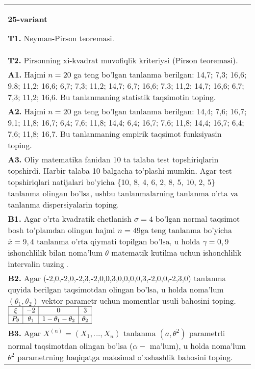 \documentclass{article}
\begin{document}
\vspace{1cm}


\begin{tabular}{m{17cm}}
\textbf{25-variant}
\newline

\textbf{T1.} 
Neyman-Pirson teoremasi.
\\
\textbf{T2.} 
Pirsonning xi-kvadrat muvofiqlik kriteriysi (Pirson teoremasi).
\\
\textbf{A1.} 
Hajmi \(n = 20\) ga teng bo'lgan tanlanma berilgan: 14,7; 7,3; 16,6; 9,8; 11,2; 16,6; 6,7; 7,3; 11,2; 14,7; 6,7; 16,6; 7,3; 11,2; 14,7; 16,6; 6,7; 7,3; 11,2; 16,6. Bu tanlanmaning statistik taqsimotin toping.
\\
\textbf{A2.} 
Hajmi \(n = 20\) ga teng bo'lgan tanlanma berilgan: 14,4; 7,6; 16,7; 9,1; 11,8; 16,7; 6,4; 7,6; 11,8; 14,4; 6,4; 16,7; 7,6; 11,8; 14,4; 16,7; 6,4; 7,6; 11,8; 16,7. Bu tanlanmaning empirik taqsimot funksiyasin toping.
\\
\textbf{A3.} 
Oliy matematika fanidan 10 ta talaba test topshiriqlarin topshirdi. Harbir talaba 10 balgacha to'plashi mumkin. Agar test topshiriqlari natijalari bo'yicha \{10, 8, 4, 6, 2, 8, 5, 10, 2, 5\} tanlanma olingan bo'lsa, ushbu tanlanmalarning tanlanma o'rta va tanlanma dispersiyalarin toping.
\\
\textbf{B1.} 
Agar o'rta kvadratik chetlanish \(\sigma = 4\) bo'lgan normal taqsimot bosh to'plamdan olingan hajmi \(n = 49\)ga teng tanlanma bo'yicha \(\overline{x} = 9,4\) tanlanma o'rta qiymati topilgan bo'lsa, u holda \(\gamma = 0,9\) ishonchlilik bilan noma'lum \(\theta\) matematik kutilma uchun ishonchlilik intervalin tuzing .
\\
\textbf{B2.} 
Agar (-2,0,-2,0,-2,3,-2,0,0,3,0,0,0,0,3,-2,0,0,-2,3,0) tanlanma quyida berilgan taqsimotdan olingan bo'lsa, u holda noma'lum \(\left( \theta_{1},\theta_{2} \right)\) vektor parametr uchun momentlar usuli bahosini toping.
$\begin{array}{|c|c|c|c|}
    \hline
    \xi & - 2 & 0 & 3\\
    \hline
    P_{\theta} & \theta_{1} & 1 - \theta_{1} - \theta_{2} & \theta_{2} \\
    \hline
\end{array}$
\\
\textbf{B3.} 
Agar \(X^{(n)} = \left( X_{1},...,X_{n} \right)\) tanlanma \(\left( a,\theta^{2} \right)\) parametrli normal taqsimotdan olingan bo'lsa (\(\alpha -\) ma'lum), u holda noma'lum \(\theta^{2}\) parametrning haqiqatga maksimal o'xshashlik bahosini toping.

\end{tabular}
\end{document}
